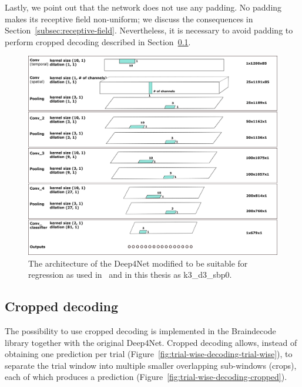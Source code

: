 Lastly, we point out that the network does not use any padding. 
No padding makes its receptive field non-uniform; we discuss the consequences in Section~\ref{subsec:receptive-field}.
Nevertheless, it is necessary to avoid padding to perform cropped decoding described in Section~\ref{subsec:cropped-decoding}.

\begin{figure}[!htbp]
\centering
\includegraphics[width=\linewidth]{img/ch3/architektura.png}
\caption[Deep4Net architecture]{The architecture of the Deep4Net modified to be suitable for regression as used in~\cite{Hammer-2021} and in this thesis as k3\_d3\_sbp0.}
\label{fig:architecture}
\end{figure}

\subsection{Cropped decoding}\label{subsec:cropped-decoding}
The possibility to use cropped decoding is implemented in the Braindecode library together with the original Deep4Net.
Cropped decoding allows, instead of obtaining one prediction per trial (Figure~\ref{fig:trial-wise-decoding-trial-wise}), to separate the trial window into multiple smaller overlapping sub-windows (crops), each of which produces a prediction (Figure~\ref{fig:trial-wise-decoding-cropped}).

